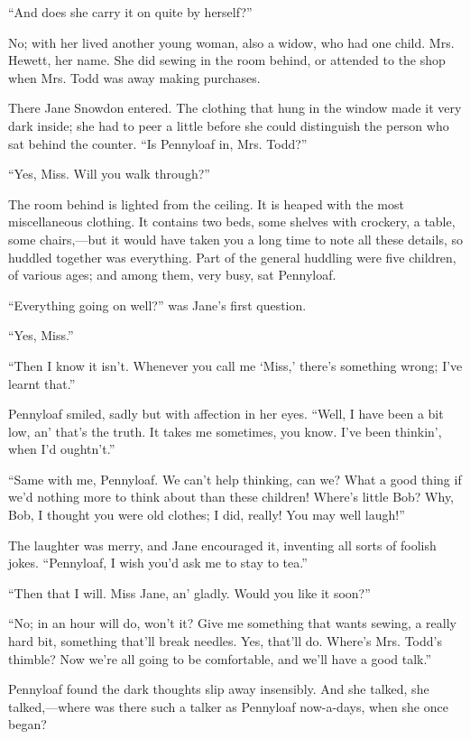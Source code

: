 ``And does she carry it on quite by herself?''

No; with her lived another young woman, also a widow, who had one child.
Mrs. Hewett, her name. She did sewing in the room behind, or attended to
the shop when Mrs. Todd was away making purchases.

There Jane Snowdon entered. The clothing that hung in the window made it
very dark inside; she had to peer a little before she could distinguish
the person who sat behind the counter. ``Is Pennyloaf in, Mrs. Todd?''

``Yes, Miss. Will you walk through?''

The room behind is lighted from the ceiling. It is heaped with the most
miscellaneous clothing. It contains two beds, some shelves with
crockery, a table, some chairs,---but it would have taken you a long
time to note all these {}details, so huddled together was everything.
Part of the general huddling were five children, of various ages; and
among them, very busy, sat Pennyloaf.

``Everything going on well?'' was Jane's first question.

``Yes, Miss.''

``Then I know it isn't. Whenever you call me `Miss,' there's something
wrong; I've learnt that.''

Pennyloaf smiled, sadly but with affection in her eyes. ``Well, I have
been a bit low, an' that's the truth. It takes me sometimes, you know.
I've been thinkin', when I'd oughtn't.''

``Same with me, Pennyloaf. We can't help thinking, can we? What a good
thing if we'd nothing more to think about than these children! Where's
little Bob? Why, Bob, I thought you were old clothes; I did, really! You
may well laugh!''

The laughter was merry, and Jane encouraged it, inventing all sorts of
foolish jokes. ``Pennyloaf, I wish you'd ask me to stay to tea.''

``Then that I will. Miss Jane, an' gladly. Would you like it soon?''

``No; in an hour will do, won't it? Give {}me something that wants
sewing, a really hard bit, something that'll break needles. Yes, that'll
do. Where's Mrs. Todd's thimble? Now we're all going to be comfortable,
and we'll have a good talk.''

Pennyloaf found the dark thoughts slip away insensibly. And she talked,
she talked,---where was there such a talker as Pennyloaf now-a-days,
when she once began?

